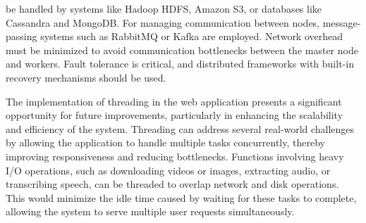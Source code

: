 be handled by systems like Hadoop HDFS, Amazon S3, or databases like Cassandra and MongoDB. For managing communication between nodes, message-passing systems such as RabbitMQ or Kafka are employed. Network overhead must be minimized to avoid communication bottlenecks between the master node and workers. Fault tolerance is critical, and distributed frameworks with built-in recovery mechanisms should be used.

\vspace{1em}

\noindent
The implementation of threading in the web application presents a significant opportunity for future improvements, particularly in enhancing the scalability and efficiency of the system. Threading can address several real-world challenges by allowing the application to handle multiple tasks concurrently, thereby improving responsiveness and reducing bottlenecks. Functions involving heavy I/O operations, such as downloading videos or images, extracting audio, or transcribing speech, can be threaded to overlap network and disk operations. This would minimize the idle time caused by waiting for these tasks to complete, allowing the system to serve multiple user requests simultaneously. 


\pagebreak
